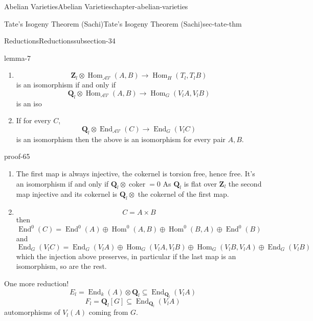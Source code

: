 \documentclass[oneside,10pt,]{book}
\numberwithin{equation}{section}
\newcommand{\ZZ}{\mathbf{Z}}
\newcommand{\QQ}{\mathbf{Q}}
\newcommand{\cat}[1]{\mathcal{#1}}
\DeclareMathOperator{\coker}{coker}
\DeclareMathOperator{\End}{End}
\DeclareMathOperator{\Hom}{Hom}
\begin{document}
\begin{chapterptx}{Abelian Varieties}{}{Abelian Varieties}{}{}{chapter-abelian-varieties}
\begin{sectionptx}{Tate's Isogeny Theorem (Sachi)}{}{Tate's Isogeny Theorem (Sachi)}{}{}{sec-tate-thm}
\begin{subsectionptx}{Reductions}{}{Reductions}{}{}{subsection-34}
\begin{lemma}{}{}{lemma-7}
\begin{enumerate}
\item\hypertarget{li-73}{}%
\begin{equation*}
\ZZ_l \otimes \Hom_\cat{AV} (A,B) \to \Hom_H(T_l, T_lB)
\end{equation*}
is an isomorphism if and only if%
\begin{equation*}
\QQ_l \otimes \Hom_\cat{AV} (A,B) \to \Hom_G(V_l A, V_l B)
\end{equation*}
is an iso%
\item\hypertarget{li-74}{}If for every \(C\),%
\begin{equation*}
\QQ_l \otimes \End_\cat{AV} (C) \to \End_G(V_l C)
\end{equation*}
is an isomorphism then the above is an isomorphism for every pair \(A,B\).%
\end{enumerate}
%
\end{lemma}
\begin{proofptx}{}{proof-65}
\hypertarget{p-386}{}%
\leavevmode%
\begin{enumerate}
\item\hypertarget{li-75}{}The first map is always injective, the cokernel is torsion free, hence free. It's an isomorphism if and only if \(\QQ_l \otimes \coker = 0\) As \(\QQ_l\) is flat over \(\ZZ_l\) the second map injective and its cokernel is \(\QQ_l \otimes\) the cokernel of the first map.%
\item\hypertarget{li-76}{}%
\begin{equation*}
C = A\times B
\end{equation*}
then%
\begin{equation*}
\End^0(C) = \End^0(A)\oplus \Hom^0(A,B) \oplus \Hom^0(B,A) \oplus \End^0(B)
\end{equation*}
and%
\begin{equation*}
\End_G(V_lC) = \End_G(V_lA)\oplus \Hom_G(V_lA,V_lB) \oplus \Hom_G(V_lB,V_lA) \oplus \End_G(V_lB)
\end{equation*}
which the injection above preserves, in  particular if the last map is an isomorphism, so are the rest.%
\end{enumerate}
%
\end{proofptx}
\hypertarget{p-387}{}%
One more reduction!%
\begin{equation*}
E_l = \End_k(A) \otimes \QQ_l\subseteq \End_{\QQ_l} (V_lA)
\end{equation*}
%
\begin{equation*}
F_l = \QQ_l[G] \subseteq \End_{\QQ_l} (V_lA)
\end{equation*}
automorphisms of \(V_l(A) \) coming from \(G\).%

\end{subsectionptx}
\end{sectionptx}
\end{chapterptx}
\end{document}
